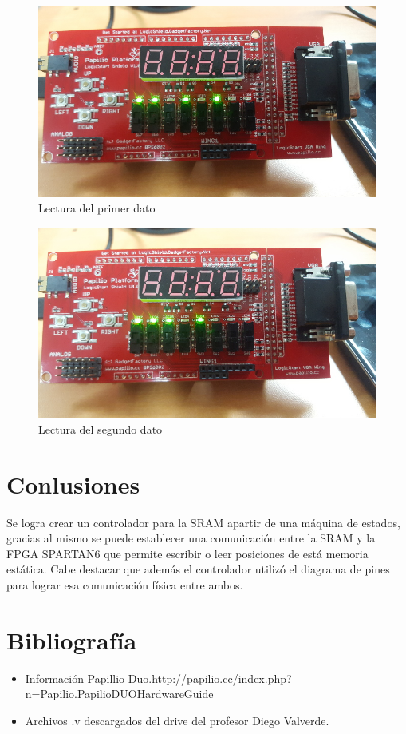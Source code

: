 \documentclass[10pt]{article}
\begin{document}
\begin{figure}[hbtp]
\centering
\includegraphics[width=1\textwidth]{lecturaa.jpg}
\caption{Lectura del primer dato}
\label{lectura_1}
\end{figure}

\begin{figure}[hbtp]
\centering
\includegraphics[width=1\textwidth]{lecturab.jpg}
\caption{Lectura del segundo dato}
\label{lectura_2}
\end{figure}
\pagebreak
\section{Conlusiones}
Se logra crear un controlador para la SRAM apartir de una máquina de estados, gracias al mismo se puede establecer una comunicación entre la SRAM y la FPGA SPARTAN6 que permite escribir o leer posiciones de está memoria estática. Cabe destacar que además el controlador utilizó el diagrama de pines para lograr esa comunicación física entre ambos.\\
\section{Bibliografía}
\begin{itemize}
\item Información Papillio Duo.http://papilio.cc/index.php?n=Papilio.PapilioDUOHardwareGuide
\item Archivos .v descargados del drive del profesor Diego Valverde.
\end{itemize}
\end{document}
